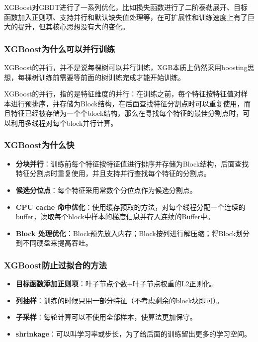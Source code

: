 \documentclass[12pt]{article}
\begin{document}
XGBoost对GBDT进行了一系列优化，比如损失函数进行了二阶泰勒展开、目标函数加入正则项、支持并行和默认缺失值处理等，在可扩展性和训练速度上有了巨大的提升，但其核心思想没有大的变化。


\subsubsection{XGBoost为什么可以并行训练}
XGBoost的并行，并不是说每棵树可以并行训练，XGB本质上仍然采用boosting思想，每棵树训练前需要等前面的树训练完成才能开始训练。

XGBoost的并行，指的是特征维度的并行：在训练之前，每个特征按特征值对样本进行预排序，并存储为Block结构，在后面查找特征分割点时可以重复使用，而且特征已经被存储为一个个block结构，那么在寻找每个特征的最佳分割点时，可以利用多线程对每个block并行计算。

\subsubsection{XGBoost为什么快}
\begin{itemize}
\setlength{\itemsep}{0pt}
\setlength{\parsep}{0pt}
\setlength{\parskip}{0pt}
    \item \textbf{分块并行}：训练前每个特征按特征值进行排序并存储为Block结构，后面查找特征分割点时重复使用，并且支持并行查找每个特征的分割点。
    \item \textbf{候选分位点}：每个特征采用常数个分位点作为候选分割点。
    \item \textbf{CPU cache 命中优化}：使用缓存预取的方法，对每个线程分配一个连续的buffer，读取每个block中样本的梯度信息并存入连续的Buffer中。
    \item \textbf{Block 处理优化}：Block预先放入内存；Block按列进行解压缩；将Block划分到不同硬盘来提高吞吐。
\end{itemize}

\subsubsection{XGBoost防止过拟合的方法}
\begin{itemize}
\setlength{\itemsep}{0pt}
\setlength{\parsep}{0pt}
\setlength{\parskip}{0pt}
    \item \textbf{目标函数添加正则项}：叶子节点个数+叶子节点权重的L2正则化。
    \item \textbf{列抽样}：训练的时候只用一部分特征（不考虑剩余的block块即可）。
    \item \textbf{子采样}：每轮计算可以不使用全部样本，使算法更加保守。
    \item \textbf{shrinkage}：可以叫学习率或步长，为了给后面的训练留出更多的学习空间。
\end{itemize}
\end{document}
